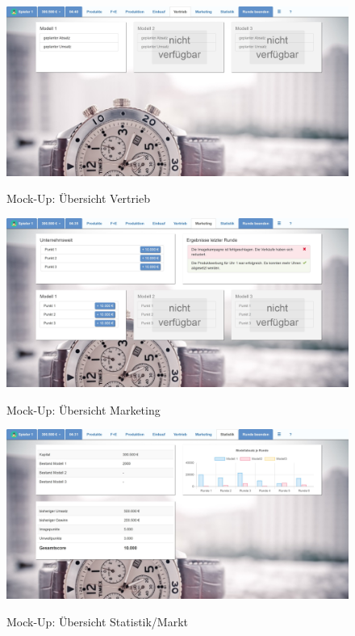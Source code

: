 \begin{figure} 
	\centering
	\includegraphics[scale=0.1]{img/bilder_layout/MockUp7.jpg}
	\label{fig:abb9}
	\caption{Mock-Up: Übersicht Vertrieb} 
\end{figure}
\begin{figure} 
	\centering
	\includegraphics[scale=0.1]{img/bilder_layout/MockUp9.jpg}
	\label{fig:abb10}
	\caption{Mock-Up: Übersicht Marketing} 
\end{figure}
\begin{figure} 
	\centering
	\includegraphics[scale=0.1]{img/bilder_layout/MockUp5.jpg}
	\label{fig:abb11}
	\caption{Mock-Up: Übersicht Statistik/Markt} 
\end{figure}
